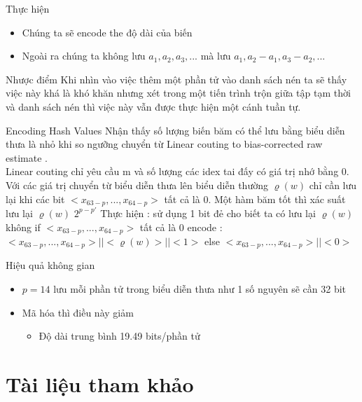 \documentclass{beamer}
\begin{document}
\begin{frame}{Thực hiện}
\begin{itemize}
\item Chúng ta sẽ encode the độ dài của biến
\item Ngoài ra chúng ta không lưu $a_1,a_2,a_3,...$ mà lưu $ a_1,a_2-a_1,a_3-a_2,...$
\end{itemize}
\end{frame}
\begin{frame}{Nhược điểm }
Khi nhìn vào việc thêm một phần tử vào danh sách nén ta sẽ thấy việc này khá là khó khăn nhưng xét trong một tiến trình trộn giữa tập tạm thời và danh sách nén thì việc này vẫn được thực hiện một cánh tuần tự.
\end{frame}
\begin{frame}{Encoding Hash Values}
Nhận thấy số lượng biến băm có thể lưu bằng biểu diễn thưa là nhỏ khi so ngưỡng chuyển từ Linear couting to bias-corrected raw
estimate . \\
Linear couting  chỉ yêu cầu m và số lượng các idex tai đấy có giá trị nhớ bằng 0.
Với các giá trị chuyển từ biểu diễn thưa lên biểu diễn thường $\varrho(w)$ chỉ cần lưu lại khi các bit $<x_{63-p} ,...,x_{64-p}>$ tất cả là 0. Một hàm băm tốt thì xác suất lưu lại  $\varrho(w)$ $ 2^{p-p'}$
Thực hiện : sử dụng 1 bit đẻ cho biết ta có lưu lại $\varrho(w)$ không 
if $<x_{63-p} ,...,x_{64-p}>$ tất cả là 0 encode :  $<x_{63-p} ,...,x_{64-p}> || <\varrho(w)>||<1>$
else $<x_{63-p} ,...,x_{64-p}> ||<0>$ 
\end{frame}
\begin{frame}{Hiệu quả không gian}
\begin{figure}[H]
\end{figure}
\begin{itemize}
\item $p = 14$ lưu mỗi phần tử trong biểu diễn thưa như 1 số nguyên sẽ cần 32 bit
\item Mã hóa thì điều này giảm 
\begin{itemize}
\item Độ dài trung bình 19.49 bits/phần tử
\end{itemize}
\end{itemize}
\end{frame}

\section*{Tài liệu tham khảo}
\end{document}
